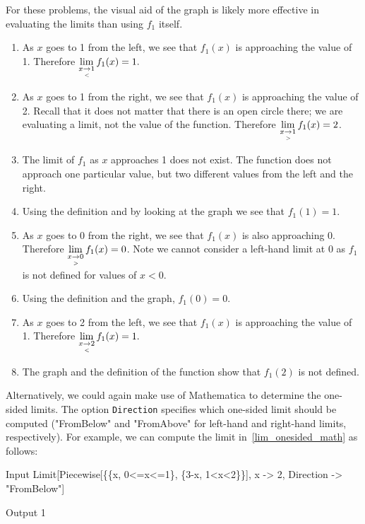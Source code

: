 \begin{example}
For these problems, the visual aid of the graph is likely more effective in evaluating the limits than using $f_1$ itself. 
			\begin{enumerate}
			\item		As $x$ goes to 1 from the left, we see that $f_1(x)$ is approaching the value of 1. Therefore $\displaystyle \lim_{x\underset{<}{\rightarrow}1} f_1(x) =1.$
			\item		As $x$ goes to 1 from the right, we see that $f_1(x)$ is approaching the value of 2. Recall that it does not matter that there is an open circle there; we are evaluating a limit, not the value of the function. Therefore $\displaystyle \lim_{x\underset{>}{\rightarrow}1} f_1(x)=2$.
			\item		The limit of $f_1$ as $x$ approaches 1 does not exist. The function does not approach one particular value, but two different values from the left and the right.
			\item		Using the definition and by looking at the graph we see that $f_1(1) = 1$.
			\item		As $x$ goes to 0 from the right, we see that $f_1(x)$ is also approaching 0. Therefore $\displaystyle \lim_{x\underset{>}{\rightarrow}0} f_1(x)=0$. Note we cannot consider a left-hand limit at 0 as $f_1$ is not defined for values of $x<0$.
			\item		Using the definition and the graph, $f_1(0) = 0$.
			\item\label{lim_onesided_math}		As $x$ goes to 2 from the left, we see that $f_1(x)$ is approaching the value of 1. Therefore $\displaystyle \lim_{x\underset{<}{\rightarrow}2} f_1(x)=1.$
			\item		The graph and the definition of the function show that $f_1(2)$ is not defined.
			\end{enumerate}
\ifmathematica
\ifcourse
Alternatively, we could again make use of Mathematica to determine the one-sided limits. The option \lstinline{Direction} specifies which one-sided limit should be computed ("FromBelow" and "FromAbove" for left-hand and right-hand limits, respectively). For example, we can compute the limit in~\ref{lim_onesided_math} as follows:
\begin{mdframed}[default,backgroundcolor=gray!40,roundcorner=8pt]
\begin{mmaCell}[morefunctionlocal={x},moredefined={Direction}]{Input}
  Limit[Piecewise[\{\{x, 0<=x<=1\}, \{3-x, 1<x<2\}\}], x -> 2, Direction -> "FromBelow"]
\end{mmaCell}

\begin{mmaCell}{Output}
  1
\end{mmaCell}
\end{mdframed}
\fi
\fi


\end{example}
